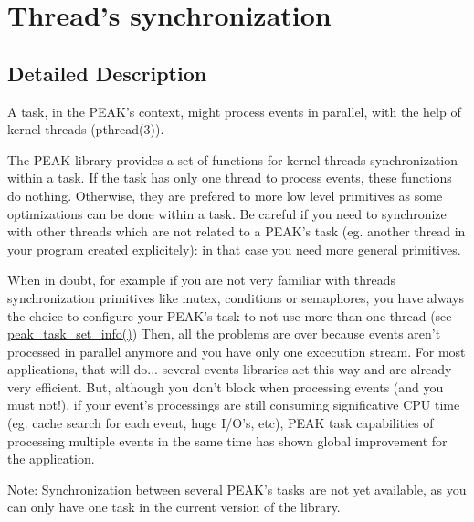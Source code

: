 \hypertarget{group__task__sync}{
\section{Thread's synchronization}
\label{group__task__sync}
}


\subsection{Detailed Description}
\begin{Desc}
\item[]A task, in the PEAK's context, might process events in parallel, with the help of kernel threads (pthread(3)).\end{Desc}
\begin{Desc}
\item[]The PEAK library provides a set of functions for kernel threads synchronization within a task. If the task has only one thread to process events, these functions do nothing. Otherwise, they are prefered to more low level primitives as some optimizations can be done within a task. Be careful if you need to synchronize with other threads which are not related to a PEAK's task (eg. another thread in your program created explicitely): in that case you need more general primitives.\end{Desc}
\begin{Desc}
\item[]When in doubt, for example if you are not very familiar with threads synchronization primitives like mutex, conditions or semaphores, you have always the choice to configure your PEAK's task to not use more than one thread (see \hyperlink{group__task__common_ga17}{peak\_\-task\_\-set\_\-info()}) Then, all the problems are over because events aren't processed in parallel anymore and you have only one excecution stream. For most applications, that will do... several events libraries act this way and are already very efficient. But, although you don't block when processing events (and you must not!), if your event's processings are still consuming significative CPU time (eg. cache search for each event, huge I/O's, etc), PEAK task capabilities of processing multiple events in the same time has shown global improvement for the application.\end{Desc}
\begin{Desc}
\item[]Note: Synchronization between several PEAK's tasks are not yet available, as you can only have one task in the current version of the library. \end{Desc}


